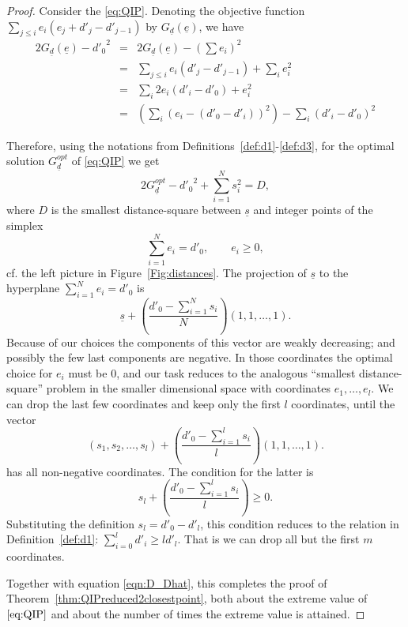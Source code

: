 \documentclass[a4paper]{amsart}
\newcommand{\us}{\underline{s}}
\newcommand{\ud}{\underline{d}}
\newcommand{\ue}{\underline{e}}
\newtheorem{thm}{Theorem}[section]
\theoremstyle{plain}
\begin{document}

\begin{proof}
Consider the \eqref{eq:QIP}. %
Denoting the objective function 
$\sum_{j\leq i} e_i(e_j+d'_j-d'_{j-1})$ by $G_{\ud}(\ue)$, we have
\begin{eqnarray*}
2G_{\ud}(\ue)-{d'_0}^2 &=& 2G_{\ud}(\ue) - \left( \sum e_i \right)^2\\
&=& \sum_{j\leq i} e_i(d'_j-d'_{j-1}) + \sum_i e_i^2\\
&=& \sum_i 2e_i(d'_i-d'_0) +e_i^2\\
&=& \left(\sum_i (e_i-(d'_0-d'_i))^2 \right)
-\sum_i (d'_i-d'_0)^2
\end{eqnarray*}

Therefore, using the notations from Definitions~\ref{def:d1}-\ref{def:d3}, for the optimal solution $G_{\ud}^{opt}$ of \eqref{eq:QIP} we get
\[
2G_{\ud}^{opt}-{d'_0}^2+\sum_{i=1}^N s_i^2 = D,
\]
where $D$ is the smallest distance-square between $\us$ and integer points of the simplex
\[ 
\sum_{i=1}^N e_i=d'_0, \qquad  e_i\geq 0,
\]
cf. the left picture in Figure~\ref{Fig:distances}. The %
projection of $\us$ to the hyperplane $\sum_{i=1}^N e_i=d'_0$ is 
\[
\us+ \left(\frac{d'_0 - \sum_{i=1}^N s_i}{N} \right)(1,1,\ldots,1).
\]
Because of our choices the components of this vector are weakly decreasing; and possibly the few last components are negative. In those coordinates the optimal choice for $e_i$ must be 0, and our task reduces to the analogous ``smallest distance-square'' problem in the smaller dimensional space with coordinates $e_1,\ldots,e_l$. We can drop the last few coordinates and keep only the first $l$ coordinates, until the vector 
\[
(s_1,s_2,\ldots,s_l) + \left(\frac{d'_0 - \sum_{i=1}^l s_i}{l}\right)(1,1,\ldots,1).
\]
has all non-negative coordinates. The condition for the latter is 
\[
s_l+\left( \frac{d'_0- \sum_{i=1}^l s_i}{l} \right) \geq 0.
\]
Substituting the definition $s_l=d'_0-d'_l$, this condition reduces to the relation in Definition~\ref{def:d1}: $\sum_{i=0}^l d'_i \geq ld'_l$. That is we can drop all but the first $m$ coordinates.

Together with equation \ref{eqn:D_Dhat}, this completes the proof of Theorem~\ref{thm:QIPreduced2closestpoint}, both about the extreme value of $\eqref{eq:QIP}$ and about the number of times the extreme value is attained.
\end{proof}
\end{document}

